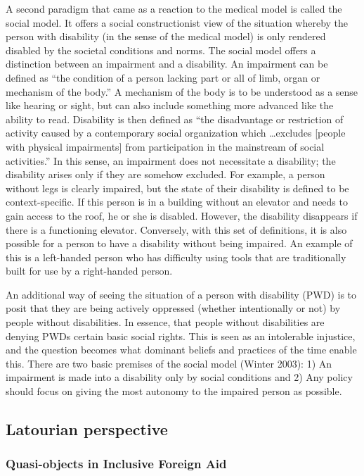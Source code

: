 \documentclass[a4paper]{article}
\begin{document}
A second paradigm that came as a reaction to the medical model is called the
social model. It offers a social constructionist view of the situation whereby
the person with disability (in the sense of the medical model) is only
rendered  disabled by the societal conditions and norms. The social model
offers a distinction between an impairment and a disability. An impairment can
be defined as ``the condition of a person lacking part or all of limb, organ
or mechanism of the body.'' A mechanism of the body is to be understood as a
sense like hearing or sight, but can also include something more advanced like
the ability to read. Disability is then defined as ``the disadvantage or
restriction of activity caused by a contemporary social organization which
\ldots excludes [people with physical impairments] from participation in the
mainstream of social activities.'' In this sense, an impairment does not
necessitate a disability; the disability arises only if they are somehow
excluded. For example, a person without legs is clearly impaired, but the
state of their disability is defined to be context-specific. If this person is
in a building without an elevator and needs to gain access to the roof, he or
she is disabled. However, the disability disappears if there is a functioning
elevator. Conversely, with this set of definitions, it is also possible for a
person to have a disability without being impaired. An example of this is a
left-handed person who has difficulty using tools that are traditionally built
for use by a right-handed person.

An additional way of seeing the situation of a person with disability (PWD) is
to posit that they are being actively oppressed (whether intentionally or not)
by people without disabilities. In essence, that people without disabilities
are denying PWDs certain basic social rights. This is seen as an intolerable
injustice, and the question becomes what dominant beliefs and practices of the
time enable this. There are two basic premises of the social model (Winter
2003): 1) An impairment is made into a disability only by social conditions
and 2) Any policy should focus on giving the most autonomy to the impaired
person as possible.  



\subsection{Latourian perspective}


\subsubsection{Quasi-objects in Inclusive Foreign Aid}
\end{document}
